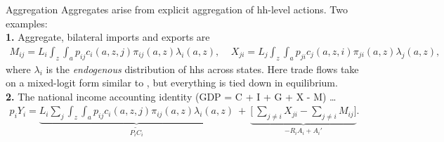 \documentclass[9pt,pdftex,aspectratio=1610]{beamer}
\theoremstyle{definition}
\begin{document}
\begin{frame}[t]{Aggregation}
\smallskip
Aggregates arise from explicit aggregation of hh-level actions. Two examples:\\
\medskip
\medskip
\textbf{1.} Aggregate, bilateral imports and exports are
\begin{align*}
M_{ij} = L_i \int_{z} \int_{a}  p_{ij} c_{i}(a, z, j) \pi_{ij}(a, z) \lambda_i(a, z), \ \ \ \ \ X_{ji} = L_j \int_{z} \int_{a}  p_{ji} c_{j}(a, z, i) \pi_{ji}(a, z) \lambda_j(a, z),
\end{align*}
where $\lambda_i$ is the \emph{endogenous} distribution of hhs across states. Here trade flows take on a mixed-logit form similar to \citet*{berry1995automobile}, but everything is tied down in equilibrium. \\
\bigskip
\bigskip
\textbf{2.} The national income accounting identity (GDP = C + I + G + X - M) \ldots
\begin{align*}
p_{i} Y_{i}  =  \underbrace{L_{i} \sum_{j} \int_{z} \int_{a}  p_{ij} c_{i}(a, z, j) \pi_{ij}(a, z) \lambda_i(a, z)}_{\widetilde{P_{i} C_i}} \ + \ \underbrace{\bigg[\ \sum_{j\neq i}X_{ji} -  \sum_{j\neq i}M_{ij} \bigg]}_{-R_{i}A_i + A_{i}'}.
\end{align*}
\end{frame}
\end{document}
